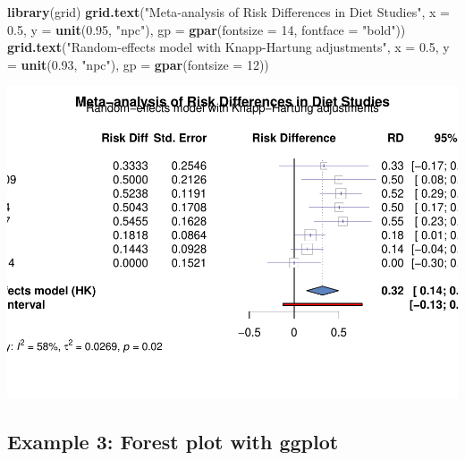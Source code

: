\documentclass[
]{book}
\newenvironment{Shaded}{\begin{snugshade}}{\end{snugshade}}
\newcommand{\AttributeTok}[1]{\textcolor[rgb]{0.13,0.29,0.53}{#1}}
\newcommand{\DecValTok}[1]{\textcolor[rgb]{0.00,0.00,0.81}{#1}}
\newcommand{\FloatTok}[1]{\textcolor[rgb]{0.00,0.00,0.81}{#1}}
\newcommand{\FunctionTok}[1]{\textcolor[rgb]{0.13,0.29,0.53}{\textbf{#1}}}
\newcommand{\NormalTok}[1]{#1}
\newcommand{\StringTok}[1]{\textcolor[rgb]{0.31,0.60,0.02}{#1}}
\begin{document}
\begin{Shaded}
\begin{Highlighting}[]
\FunctionTok{library}\NormalTok{(grid)}
\FunctionTok{grid.text}\NormalTok{(}\StringTok{"Meta{-}analysis of Risk Differences in Diet Studies"}\NormalTok{, }
          \AttributeTok{x =} \FloatTok{0.5}\NormalTok{, }\AttributeTok{y =} \FunctionTok{unit}\NormalTok{(}\FloatTok{0.95}\NormalTok{, }\StringTok{"npc"}\NormalTok{), }
          \AttributeTok{gp =} \FunctionTok{gpar}\NormalTok{(}\AttributeTok{fontsize =} \DecValTok{14}\NormalTok{, }\AttributeTok{fontface =} \StringTok{"bold"}\NormalTok{))}
\FunctionTok{grid.text}\NormalTok{(}\StringTok{"Random{-}effects model with Knapp{-}Hartung adjustments"}\NormalTok{, }
          \AttributeTok{x =} \FloatTok{0.5}\NormalTok{, }\AttributeTok{y =} \FunctionTok{unit}\NormalTok{(}\FloatTok{0.93}\NormalTok{, }\StringTok{"npc"}\NormalTok{), }
          \AttributeTok{gp =} \FunctionTok{gpar}\NormalTok{(}\AttributeTok{fontsize =} \DecValTok{12}\NormalTok{))}
\end{Highlighting}
\end{Shaded}

\includegraphics{_main_files/figure-latex/unnamed-chunk-30-1.pdf}

\subsection{Example 3: Forest plot with ggplot}\label{example-3-forest-plot-with-ggplot}
\end{document}
